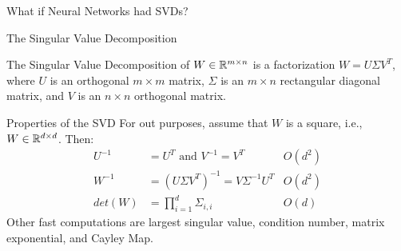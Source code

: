 \begin{frame}[standout]
	What if Neural Networks had SVDs?
\end{frame}

\begin{frame}{The Singular Value Decomposition}
	\begin{definition}
		The Singular Value Decomposition of $W \in \mathbb{R}^{m\times n}$ is a factorization
		$W = U \Sigma V^T$, where  $U$ is an \alert{orthogonal} $m \times m$ matrix,
		$\Sigma$ is an $m \times n$ rectangular diagonal matrix, and $V$ is an $n \times
		n$ \alert{orthogonal} matrix.
	\end{definition}
\end{frame}

\begin{frame}{Properties of the SVD}
	For out purposes, assume that $W$ is a square, i.e., $W \in \mathbb{R}^{d\times d}$.
	Then:
	\begin{align*}
		U^{-1} &= U^T\text{ and }V^{-1} = V^T  \quad \quad & O(d^2)\\
		W^{-1} &= (U \Sigma V^T)^{-1} = V \Sigma^{-1} U^T  & O(d^2)\\
		det(W) &= \prod_{i=1}^{d} \Sigma_{i,i}   & O(d)
	\end{align*}
	Other fast computations are largest singular value, condition number, matrix exponential, and Cayley Map.
\end{frame}

